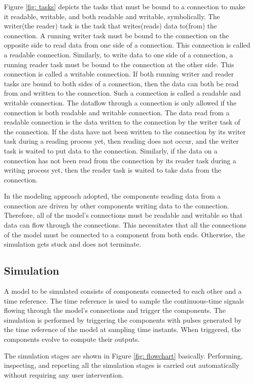 Figure \ref{fig: tasks} depicts the tasks that must be bound to a connection to make it readable, writable, and both readable and writable, symbolically. The writer(the reader) task is the task that writes(reads) data to(from) the connection. A running writer task must be bound to the connection on the opposite side to read data from one side of a connection. This connection is called a readable connection. Similarly, to write data to one side of a connection, a running reader task must be bound to the connection at the other side. This connection is called a writable connection. If both running writer and reader tasks are bound to both sides of a connection, then the data can both be read from and written to the connection. Such a connection is called a readable and writable connection. The dataflow through a connection is only allowed if the connection is both readable and writable connection. The data read from a readable connection is the data written to the connection by the writer task of the connection. If the data have not been written to the connection by its writer task during a reading process yet, then reading does not occur, and the writer task is waited to put data to the connection. Similarly, if the data on a connection has not been read from the connection by its reader task during a writing process yet, then the reader task is waited to take data from the connection.

In the modeling approach adopted, the components reading data from a connection are driven by other components writing data to the connection. Therefore, all of the model's connections must be readable and writable so that data can flow through the connections. This necessitates that all the connections of the model must be connected to a component from both ends. Otherwise, the simulation gets stuck and does not terminate.

\subsection{Simulation}
A model to be simulated consists of components connected to each other and a time reference. The time reference is used to sample the continuous-time signals flowing through the model's connections and trigger the components. The simulation is performed by triggering the components with pulses generated by the time reference of the model at sampling time instants. When triggered, the components evolve to compute their outputs.

The simulation stages are shown in Figure \ref{fig: flowchart} basically. Performing, inspecting, and reporting all the simulation stages is carried out automatically without requiring any user intervention.

